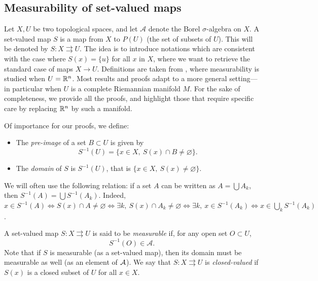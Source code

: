     \subsection{Measurability of set-valued maps}

    \label{sec:measurable_set_valued}

    Let $X, U$ be two topological spaces, and let $\mathcal{A}$ denote the Borel $\sigma$-algebra on $X$. A set-valued map $S$ is a map from $X$ to $P(U)$ (the set of subsets of $U$).
    This will be denoted by $S : X \rightrightarrows U$.
    The idea is to introduce notations which are consistent with the case where $S(x) = \{u\}$ for all $x$ in $X$, where we want to retrieve the standard case of maps $X \to U$. Definitions are taken from \cite{rockafellar2009variational}, where measurability is studied when $U = \mathbb{R}^n$. Most results and proofs adapt to a more general setting---in particular when $U$ is a complete Riemannian manifold $M$.
    For the sake of completeness, we provide all the proofs, and highlight those that require specific care by replacing $\mathbb{R}^n$ by such a manifold.

    Of importance for our proofs, we define:
    \begin{itemize}
        \item The \emph{pre-image} of a set $B \subset U$ is given by
        \[ S^{-1}(U) = \{ x \in X,\ S(x) \cap B \neq \varnothing\}. \]
        \item The \emph{domain} of $S$ is $S^{-1}(U)$, that is $\{ x \in X,\ S(x) \neq \varnothing \}$.
    \end{itemize}
    We will often use the following relation: if a set $A$ can be written as $A = \bigcup A_k$, then $S^{-1}(A) = \bigcup S^{-1}(A_k)$. Indeed, $x \in S^{-1}(A) \Leftrightarrow S(x) \cap A \neq \varnothing \Leftrightarrow \exists k,\ S(x) \cap A_k \neq \varnothing \Leftrightarrow \exists k,\ x \in S^{-1}(A_k) \Leftrightarrow x \in \bigcup_k S^{-1}(A_k)$.

    A set-valued map $S : X \rightrightarrows U$ is said to be \emph{measurable} if, for any open set $O \subset U$,
    \begin{equation}
        S^{-1}(O) \in \mathcal{A}.
    \end{equation}
    Note that if $S$ is measurable (as a set-valued map), then its domain must be measurable as well (as an element of $\mathcal{A}$).
    We say that $S : X \rightrightarrows U$ is  \emph{closed-valued} if $S(x)$ is a closed subset of $U$ for all $x \in X$.

